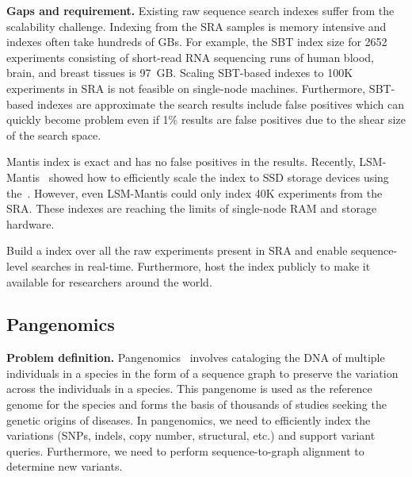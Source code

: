 \noindent
\textbf{Gaps and requirement.}
Existing raw sequence search indexes suffer from the scalability challenge. Indexing \kmers from the SRA samples is memory intensive and indexes often take hundreds of GBs. For example, the SBT index size for 2652 experiments consisting of short-read RNA sequencing runs of human blood, brain, and breast tissues is 97~GB\@. Scaling SBT-based indexes to 100K experiments in SRA is not feasible on single-node machines.
Furthermore, SBT-based indexes are approximate the search results include false positives which can quickly become problem even if 1\% results are false positives due to the shear size of the search space.

Mantis index is exact and has no false positives in the results. Recently, LSM-Mantis~\cite{almodaresi2022incrementally} showed how to efficiently scale the index to SSD storage devices using the~\cite{BentleyS80}. However, even LSM-Mantis could only index 40K experiments from the SRA\@. These indexes are reaching the limits of single-node RAM and storage hardware.

\begin{rproblem}
Build a \kmer index over all the raw experiments present in SRA and enable sequence-level searches in real-time. Furthermore, host the index publicly to make it available for researchers around the world. 
\label{rprob:seq-search}
\end{rproblem}

\subsection{Pangenomics}

\textbf{Problem definition.}
Pangenomics~\cite{sherman2020pan} involves cataloging the DNA of multiple individuals in a species in the form of a sequence graph to preserve the variation across the individuals in a species. This pangenome is used as the reference genome for the species and forms the basis of thousands of studies seeking the genetic origins of diseases. In pangenomics, we need to efficiently index the variations (SNPs, indels, copy number, structural, etc.) and support variant queries. Furthermore, we need to perform sequence-to-graph alignment to determine new variants.


